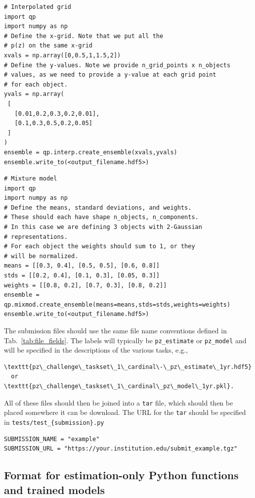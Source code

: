 \documentclass[11pt,twoside,letterpaper,onecolumn,english]{article}
\begin{document}
\begin{verbatim}
# Interpolated grid
import qp
import numpy as np
# Define the x-grid. Note that we put all the
# p(z) on the same x-grid
xvals = np.array([0,0.5,1,1.5,2])
# Define the y-values. Note we provide n_grid_points x n_objects 
# values, as we need to provide a y-value at each grid point 
# for each object.
yvals = np.array(
 [
   [0.01,0.2,0.3,0.2,0.01],
   [0.1,0.3,0.5,0.2,0.05]
 ]
)
ensemble = qp.interp.create_ensemble(xvals,yvals)
ensemble.write_to(<output_filename.hdf5>)
\end{verbatim}

\begin{verbatim}
# Mixture model
import qp
import numpy as np
# Define the means, standard deviations, and weights.
# These should each have shape n_objects, n_components.
# In this case we are defining 3 objects with 2-Gaussian 
# representations.
# For each object the weights should sum to 1, or they
# will be normalized.
means = [[0.3, 0.4], [0.5, 0.5], [0.6, 0.8]]
stds = [[0.2, 0.4], [0.1, 0.3], [0.05, 0.3]]
weights = [[0.8, 0.2], [0.7, 0.3], [0.8, 0.2]]
ensemble = qp.mixmod.create_ensemble(means=means,stds=stds,weights=weights)
ensemble.write_to(<output_filename.hdf5>)
\end{verbatim}

The submission files should use the same file name conventions defined
in Tab.~\ref{tab:file_fields}. The labels will typically be
\texttt{pz\_estimate} or \texttt{pz\_model} and will be specified in
the descriptions of the various tasks, e.g.,

\begin{verbatim}
\texttt{pz\_challenge\_taskset\_1\_cardinal\-\_pz\_estimate\_1yr.hdf5}
  or
\texttt{pz\_challenge\_taskset\_1\_cardinal\_pz\_model\_1yr.pkl}.
\end{verbatim}

All of these files should then be joined into a \texttt{tar} file, which 
should then be placed somewhere it can be download.  The URL for the
\texttt{tar} should be specified in
\texttt{tests/test\_\{submission\}.py}

\begin{verbatim}
SUBMISSION_NAME = "example"
SUBMISSION_URL = "https://your.institution.edu/submit_example.tgz"
\end{verbatim}


\subsection{Format for estimation-only Python functions and trained models}
\end{document}
